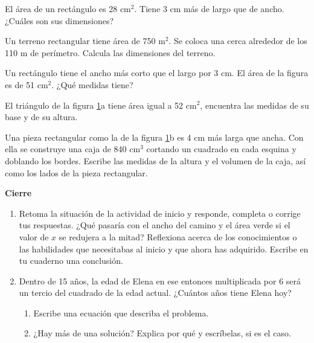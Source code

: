 \documentclass[11pt]{book}
\begin{document}
\begin{enumerate}
\begin{minipage}[t]{0.35\textwidth}
\begin{figure}[H]
                  \label{fig:figuras2.7}
              \end{figure}
          \end{minipage}\hfill
          \begin{minipage}[t]{0.5\textwidth}
              \item El área de un rectángulo es 28 cm$^2$. Tiene 3 cm más de largo que de ancho. ¿Cuáles son sus dimensiones?
              \item Un terreno rectangular tiene área de 750 m$^2$. Se coloca una cerca alrededor de los 110 m de perímetro. Calcula las dimensiones del terreno.
              \item Un rectángulo tiene el ancho más corto que el largo por 3 cm. El área de la figura es de 51 cm$^2$. ¿Qué medidas tiene?
              \item El triángulo de la figura \ref{fig:figuras2.7}a tiene área igual a 52 cm$^2$, encuentra las medidas de su base y de su altura.
              \item Una pieza rectangular como la de la figura \ref{fig:figuras2.7}b es 4 cm más larga que ancha. Con ella se construye una caja de 840 cm$^3$ cortando un cuadrado
              en cada esquina y doblando los bordes. Escribe las medidas de la altura y el volumen de la caja, así como los lados de la pieza rectangular.

          \end{minipage}

\end{enumerate}


\begin{boxK}
    \begin{center}\textbf{Cierre}\end{center}

    \begin{enumerate}
        \item Retoma la situación de la actividad de inicio y responde, completa o corrige
              tus respuestas. ¿Qué pasaría con el ancho del camino y el área verde si el
              valor de $x$ se redujera a la mitad?
              Reflexiona acerca de los conocimientos o las habilidades que necesitabas al
              inicio y que ahora has adquirido. Escribe en tu cuaderno una conclusión.
        \item Dentro de 15 años, la edad de Elena en ese entonces multiplicada por 6 será
              un tercio del cuadrado de la edad actual. ¿Cuántos años tiene Elena hoy?

              \begin{enumerate}
                  \item Escribe una ecuación que describa el problema.
                  \item ¿Hay más de una solución? Explica por qué y escríbelas, si es el caso.
              \end{enumerate}
    \end{enumerate}
\end{boxK}
\end{document}
